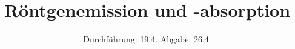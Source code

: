 

\subject{V 605}
\title{Röntgenemission und -absorption}
\date{
  Durchführung: 19.4.
  \hspace{3em}
  Abgabe: 26.4.
}



\maketitle
\thispagestyle{empty}
\tableofcontents
\newpage






\printbibliography


